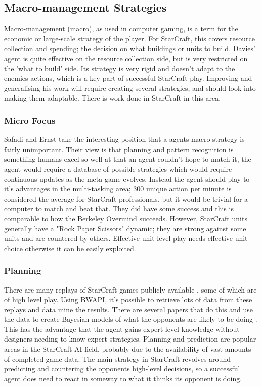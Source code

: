 \documentclass[11pt,openright,a4paper]{report}
\begin{document}
\subsection{Macro-management Strategies}
Macro-management (macro), as used in computer gaming, is a term for the economic or large-scale strategy of the player. For StarCraft, this covers resource collection and spending; the decision on what buildings or units to build. Davies' agent is quite effective on the resource collection side, but is very restricted on the 'what to build' side. Its strategy is very rigid and doesn't adapt to the enemies actions, which is a key part of successful StarCraft play. Improving and generalising his work will require creating several strategies, and should look into making them adaptable. There is work done in StarCraft in this area.

\subsubsection{Micro Focus}
Safadi and Ernst \cite{safadi2010organization} take the interesting position that a agents macro strategy is fairly unimportant. Their view is that planning and pattern recognition is something humans excel so well at that an agent couldn't hope to match it, the agent would require a database of possible strategies which would require continuous updates as the meta-game evolves. Instead the agent should play to it's advantages in the multi-tasking area; 300 unique action per minute is considered the average for StarCraft professionals, but it would be trivial for a computer to match and beat that. They did have some success and this is comparable to how the Berkeley Overmind succeeds. However, StarCraft units generally have a "Rock Paper Scissors" dynamic; they are strong against some units and are countered by others. Effective unit-level play needs effective unit choice otherwise it can be easily exploited.

\subsubsection{Planning}
There are many replays of StarCraft games publicly available \cite{Replays}, some of which are of high level play. Using BWAPI, it's possible to retrieve lots of data from these replays and data mine the results. There are several papers that do this and use the data to create Bayesian models of what the opponents are likely to be doing \cite{synnaeve2011bayesian,hostetler2012inferring,weber2009data}.  This has the advantage that the agent gains expert-level knowledge without designers needing to know expert strategies. Planning and prediction are popular areas in the StarCraft AI field, probably due to the availability of vast amounts of completed game data. The main strategy in StarCraft revolves around predicting and countering the opponents high-level decisions, so a successful agent does need to react in someway to what it thinks its opponent is doing.
\end{document}
